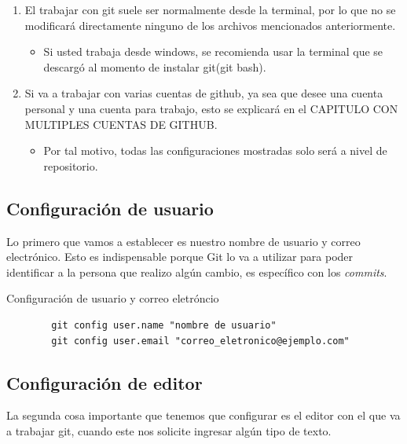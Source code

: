 \begin{pucpImportant}
	
	\begin{enumerate}
		\item El trabajar con git suele ser normalmente desde la terminal, por lo que no se modificará directamente ninguno de los archivos mencionados anteriormente.
		\begin{itemize}
			\item Si usted trabaja desde windows, se recomienda usar la terminal que se descargó al momento de instalar git(git bash).
		\end{itemize}
		\item Si va a trabajar con varias cuentas de github, ya sea que desee una cuenta personal y una cuenta para trabajo, esto se explicará en el \textcolor{pucpRojo}	{CAPITULO CON MULTIPLES CUENTAS DE GITHUB}.
		\begin{itemize}
			\item Por tal motivo, todas las configuraciones mostradas solo será a nivel de repositorio.
		\end{itemize}
	\end{enumerate}

\end{pucpImportant}

\subsection{Configuración de usuario}

Lo primero que vamos a establecer es nuestro nombre de usuario y correo electrónico. Esto es indispensable
porque Git lo va a utilizar para poder identificar a la persona que realizo algún cambio, es específico con los \emph{commits}.

\begin{gitCode}{Configuración de usuario y correo eletróncio}
	\begin{verbatim}
		git config user.name "nombre de usuario"
		git config user.email "correo_eletronico@ejemplo.com"
	\end{verbatim}
\end{gitCode}

\subsection{Configuración de editor}

La segunda cosa importante que tenemos que configurar es el editor con el que va a trabajar git, cuando este nos solicite ingresar algún tipo de texto.


